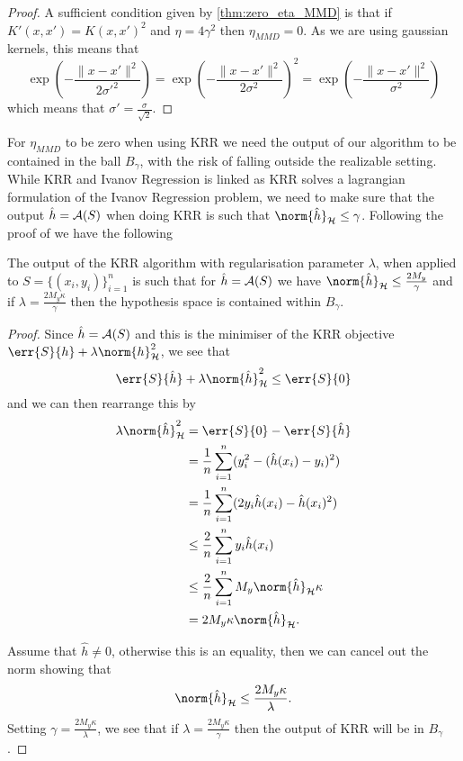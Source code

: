 \begin{proof}
  A sufficient condition given by \ref{thm:zero_eta_MMD} is that if \(K'(x, x') =
  K(x, x')^2\) and \(\eta = 4\gamma^2\) then \(\eta_{MMD} = 0\). As we are using
  gaussian kernels, this means that
  \begin{equation*}
    \exp(- \frac{\|x - x'\|^2}{2\sigma'^2}) = \exp(- \frac{\|x - x'\|^2}{2\sigma^2})^2 = \exp(- \frac{\|x - x'\|^2}{\sigma^2})
  \end{equation*}
  which means that \(\sigma' = \frac{\sigma}{\sqrt{2}}\).
\end{proof}

For \(\eta_{MMD}\) to be zero when using KRR we need the output of our algorithm to be
contained in the ball \(B_{\gamma}\), with the risk of falling outside the
realizable setting. While KRR and Ivanov Regression is linked
as KRR solves a lagrangian formulation of the Ivanov Regression problem, we need
to make sure that the output \(\hat{h} = \mathcal{A}(S)\) when doing KRR is such that
\(\norm{\hat{h}}_{\rkhs{H}} \leq \gamma\). Following the proof of \citep[Lemma
1]{cortes14_domain_adapt_sampl_bias_correc} we have the following
\begin{lemma}
\label{lem:KRR-output-ball-bound} The output of the KRR algorithm with
regularisation parameter \(\lambda\), when applied
to \(S = \{(x_{i}, y_{i})\}_{i=1}^{n}\) is such that for \(\hat{h} = \mathcal{A}(S)\) we have
\(\norm{\hat{h}}_{\rkhs{H}} \leq \frac{2 M_{y}}{\gamma}\) and if \(\lambda =
\frac{2 M_y \kappa}{\gamma}\) then the hypothesis space is contained within
\(B_{\gamma}\).
\end{lemma}
\begin{proof} Since \(\hat{h} = \mathcal{A}(S)\) and this is the minimiser of the KRR
objective \(\err{S}{h} + \lambda \norm{h}^2_{\rkhs{H}}\), we see that
  \begin{equation*} \err{S}{\hat{h}} + \lambda \norm{\hat{h}}_{\rkhs{H}}^2 \leq
\err{S}{0}
  \end{equation*} and we can then rearrange this by
  \begin{align*} \lambda \norm{\hat{h}}_{\rkhs{H}}^2 & = \err{S}{0} -
\err{S}{\hat{h}} \\ & = \frac{1}{n} \sum_{i=1}^n (y_i^2 - (\hat{h}(x_i) -
y_i)^2) \\ & = \frac{1}{n} \sum_{i=1}^n (2 y_i \hat{h}(x_i) - \hat{h}(x_i)^2) \\
& \leq \frac{2}{n} \sum_{i=1}^n y_i \hat{h}(x_i) \\ & \leq \frac{2}{n}
\sum_{i=1}^n M_y \norm{\hat{h}}_{\rkhs{H}} \kappa \\ & = 2 M_y \kappa
\norm{\hat{h}}_{\rkhs{H}}.
  \end{align*}

  Assume that \(\hat{h} \neq 0\), otherwise this is an equality, then we can
cancel out the norm showing that
  \begin{equation*}
    \label{eq:KRR-output-ball-bound} \norm{\hat{h}}_{\rkhs{H}} \leq \frac{2 M_y
\kappa}{\lambda}.
  \end{equation*} Setting \(\gamma = \frac{2 M_y \kappa}{\lambda}\), we see that
if \(\lambda = \frac{2 M_y \kappa}{\gamma}\) then the output of KRR will be in
\(B_{\gamma}\).
\end{proof}

